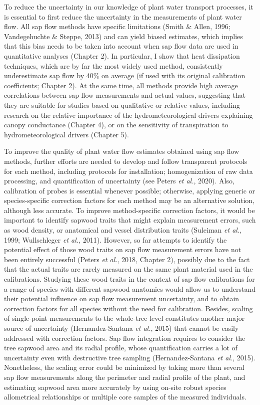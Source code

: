 \documentclass[11pt,twoside]{reedthesis}
\begin{document}
To reduce the uncertainty in our knowledge of plant water transport
processes, it is essential to first reduce the uncertainty in the
measurements of plant water flow. All sap flow methods have specific
limitations (Smith \& Allen, 1996; Vandegehuchte \& Steppe, 2013) and
can yield biased estimates, which implies that this bias needs to be
taken into account when sap flow data are used in quantitative analyses
(Chapter 2). In particular, I show that heat dissipation techniques,
which are by far the most widely used method, consistently underestimate
sap flow by 40\% on average (if used with its original calibration
coefficients; Chapter 2). At the same time, all methods provide high
average correlations between sap flow measurements and actual values,
suggesting that they are suitable for studies based on qualitative or
relative values, including research on the relative importance of the
hydrometeorological drivers explaining canopy conductance (Chapter 4),
or on the sensitivity of transpiration to hydrometeorological drivers
(Chapter 5). \par

To improve the quality of plant water flow estimates obtained using sap
flow methods, further efforts are needed to develop and follow
transparent protocols for each method, including protocols for
installation; homogenization of raw data processing, and quantification
of uncertainty (see Peters \emph{et al.}, 2020). Also, calibration of
probes is essential whenever possible; otherwise, applying generic or
species-specific correction factors for each method may be an
alternative solution, although less accurate. To improve method-specific
correction factors, it would be important to identify sapwood traits
that might explain measurement errors, such as wood density, or
anatomical and vessel distribution traits (Suleiman \emph{et al.}, 1999;
Wullschleger \emph{et al.}, 2011). However, so far attempts to identify
the potential effect of those wood traits on sap flow measurement errors
have not been entirely successful (Peters \emph{et al.}, 2018, Chapter
2), possibly due to the fact that the actual traits are rarely measured
on the same plant material used in the calibrations. Studying these wood
traits in the context of sap flow calibrations for a range of species
with different sapwood anatomies would allow us to understand their
potential influence on sap flow measurement uncertainty, and to obtain
correction factors for all species without the need for calibration.
Besides, scaling of single-point measurements to the whole-tree level
constitutes another major source of uncertainty (Hernandez-Santana
\emph{et al.}, 2015) that cannot be easily addressed with correction
factors. Sap flow integration requires to consider the tree sapwood area
and its radial profile, whose quantification carries a lot of
uncertainty even with destructive tree sampling (Hernandez-Santana
\emph{et al.}, 2015). Nonetheless, the scaling error could be minimized
by taking more than several sap flow measurements along the perimeter
and radial profile of the plant, and estimating sapwood area more
accurately by using on-site robust species allometrical relationships or
multiple core samples of the measured individuals.\par
\end{document}
